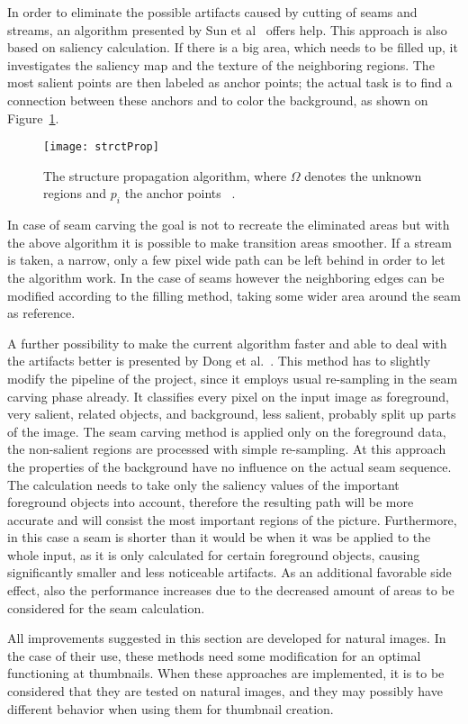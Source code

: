 \documentclass[draft,final]{vutinfth} %
\begin{document}
	In order to eliminate the possible artifacts caused by cutting of seams and streams, an algorithm presented by Sun et al~\cite{sun2005image} offers help.
	This approach is also based on saliency calculation.
	If there is a big area, which needs to be filled up, it investigates the saliency map and the texture of the neighboring regions.
	The most salient points are then labeled as anchor points; the actual task is to find a connection between these anchors and to color the background, as shown on Figure~\ref{fig:structProp}.
	\begin{figure}[h]
		\centering		
		\texttt{[image: strctProp]}
		\caption{The structure propagation algorithm, where $\Omega$ denotes the unknown regions and $p_{i}$ the anchor points ~\cite{sun2005image}.} 
		\label{fig:structProp}
	\end{figure}
	In case of seam carving the goal is not to recreate the eliminated areas but with the above algorithm it is possible to make transition areas smoother.
	If a stream is taken, a narrow, only a few pixel wide path can be left behind in order to let the algorithm work.
	In the case of seams however the neighboring edges can be modified according to the filling method, taking some wider area around the seam as reference.\par 
	A further possibility to make the current algorithm faster and able to deal with the artifacts better is presented by Dong et al.~\cite{dong2009optimized}.
	This method has to slightly modify the pipeline of the project, since it employs usual re-sampling in the seam carving phase already.
	It classifies every pixel on the input image as foreground, very salient, related objects, and background, less salient, probably split up parts of the image.
	The seam carving method is applied only on the foreground data, the non-salient regions are processed with simple re-sampling. 
	At this approach the properties of the background have no influence on the actual seam sequence.
	The calculation needs to take only the saliency values of the important foreground objects into account, therefore the resulting path will be more accurate and will consist the most important regions of the picture.
	Furthermore, in this case a seam is shorter than it would be when it was be applied to the whole input, as it is only calculated for certain foreground objects, causing significantly smaller and less noticeable artifacts.
	As an additional favorable side effect, also the performance increases due to the decreased amount of areas to be considered for the seam calculation.\par
	All improvements suggested in this section are developed for natural images.
	In the case of their use, these methods need some modification for an optimal functioning at thumbnails.
	When these approaches are implemented, it is to be considered that they are tested on natural images, and they may possibly have different behavior when using them for thumbnail creation. 
	
\end{document}
